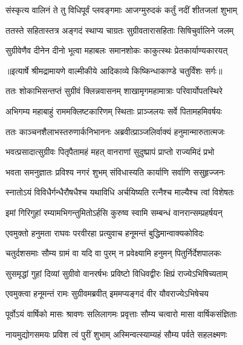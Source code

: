 \twolineshloka
{संस्कृत्य वालिनं ते तु विधिपूर्वं प्लवङ्गमाः}
{आजग्मुरुदकं कर्तुं नदीं शीतजलां शुभाम्} %

\twolineshloka
{ततस्ते सहितास्तत्र अङ्गदं स्थाप्य चाग्रतः}
{सुग्रीवतारासहिताः सिषिचुर्वालिने जलम्} %

\twolineshloka
{सुग्रीवेणैव दीनेन दीनो भूत्वा महाबलः}
{समानशोकः काकुत्स्थः प्रेतकार्याण्यकारयत्} %


{॥इत्यार्षे श्रीमद्रामायणे वाल्मीकीये आदिकाव्ये किष्किन्धाकाण्डे चतुर्विंशः सर्गः॥}


\twolineshloka
{ततः शोकाभिसन्तप्तं सुग्रीवं क्लिन्नवासनम्}
{शाखामृगमहामात्राः परिवार्योपतस्थिरे} %

\twolineshloka
{अभिगम्य महाबाहुं राममक्लिष्टकारिणम्}
{स्थिताः प्राञ्जलयः सर्वे पितामहमिवर्षयः} %

\twolineshloka
{ततः काञ्चनशैलाभस्तरुणार्कनिभाननः}
{अब्रवीत्प्राञ्जलिर्वाक्यं हनुमान्मारुतात्मजः} %

\twolineshloka
{भवत्प्रसादात्सुग्रीवः पितृपैतामहं महत्}
{वानराणां सुदुष्प्रापं प्राप्तो राज्यमिदं प्रभो} %

\twolineshloka
{भवता समनुज्ञातः प्रविश्य नगरं शुभम्}
{संविधास्यति कार्याणि सर्वाणि ससुहृज्जनः} %

\twolineshloka
{स्नातोऽयं विविधैर्गन्धैरौषधैश्च यथाविधि}
{अर्चयिष्यति रत्नैश्च माल्यैश्च त्वां विशेषतः} %

\twolineshloka
{इमां गिरिगुहां रम्यामभिगन्तुमितोऽर्हसि}
{कुरुष्व स्वामि सम्बन्धं वानरान्सम्प्रहर्षयन्} %

\twolineshloka
{एवमुक्तो हनुमता राघवः परवीरहा}
{प्रत्युवाच हनूमन्तं बुद्धिमान्वाक्यकोविदः} %

\twolineshloka
{चतुर्दशसमाः सौम्य ग्रामं वा यदि वा पुरम्}
{न प्रवेक्ष्यामि हनुमन् पितुर्निर्देशपालकः} %

\twolineshloka
{सुसमृद्धां गुहां दिव्यां सुग्रीवो वानरर्षभः}
{प्रविष्टो विधिवद्वीरः क्षिप्रं राज्येऽभिषिच्यताम्} %

\twolineshloka
{एवमुक्त्वा हनूमन्तं रामः सुग्रीवमब्रवीत्}
{इममप्यङ्गदं वीर यौवराज्येऽभिषेचय} %

\twolineshloka
{पूर्वोऽयं वार्षिको मासः श्रावणः सलिलागमः}
{प्रवृत्ताः सौम्य चत्वारो मासा वार्षिकसंज्ञिताः} %

\twolineshloka
{नायमुद्योगसमयः प्रविश त्वं पुरीं शुभाम्}
{अस्मिन्वत्स्याम्यहं सौम्य पर्वते सहलक्ष्मणः} %

